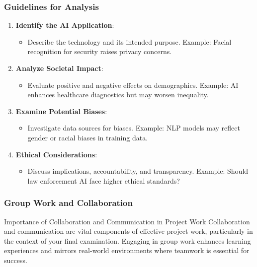 \documentclass[aspectratio=169]{beamer}
\begin{document}
\begin{frame}[fragile]
    \frametitle{Guidelines for Analysis}
    \begin{enumerate}
        \item \textbf{Identify the AI Application}:
        \begin{itemize}
            \item Describe the technology and its intended purpose. Example: Facial recognition for security raises privacy concerns.
        \end{itemize}

        \item \textbf{Analyze Societal Impact}:
        \begin{itemize}
            \item Evaluate positive and negative effects on demographics. Example: AI enhances healthcare diagnostics but may worsen inequality.
        \end{itemize}

        \item \textbf{Examine Potential Biases}:
        \begin{itemize}
            \item Investigate data sources for biases. Example: NLP models may reflect gender or racial biases in training data.
        \end{itemize}

        \item \textbf{Ethical Considerations}:
        \begin{itemize}
            \item Discuss implications, accountability, and transparency. Example: Should law enforcement AI face higher ethical standards?
        \end{itemize}
    \end{enumerate}
\end{frame}

\begin{frame}[fragile]
    \frametitle{Group Work and Collaboration}
    \begin{block}{Importance of Collaboration and Communication in Project Work}
        Collaboration and communication are vital components of effective project work, particularly in the context of your final examination. Engaging in group work enhances learning experiences and mirrors real-world environments where teamwork is essential for success.
    \end{block}
\end{frame}
\end{document}

